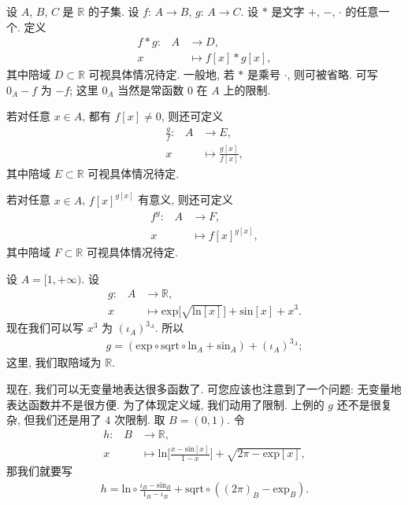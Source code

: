 \begin{definition}
    设 $A$, $B$, $C$ 是 $\mathbb{R}$ 的子集. 设 $f$: $A \to B$, $g$: $A \to C$. 设 $\ast$ 是文字 $+$, $-$, $\cdot$ 的任意一个. 定义
    \begin{align*}
        \text{$f \ast g$:} \quad
        A & \to D,                  \\
        x & \mapsto f[x] \ast g[x],
    \end{align*}
    其中陪域 $D \subset \mathbb{R}$ 可视具体情况待定. 一般地, 若 $\ast$ 是乘号 $\cdot$, 则可被省略. 可写 $0_A - f$ 为 $-f$; 这里 $0_A$ 当然是常函数 $0$ 在 $A$ 上的限制.

    若对任意 $x \in A$, 都有 $f[x] \neq 0$, 则还可定义
    \begin{align*}
        \text{$\frac{g}{f}$:} \quad
        A & \to E,                     \\
        x & \mapsto \frac{g[x]}{f[x]},
    \end{align*}
    其中陪域 $E \subset \mathbb{R}$ 可视具体情况待定.

    若对任意 $x \in A$, ${f[x]}^{g[x]}$ 有意义, 则还可定义
    \begin{align*}
        \text{${f}^{g}$:} \quad
        A & \to F,                 \\
        x & \mapsto {f[x]}^{g[x]},
    \end{align*}
    其中陪域 $F \subset \mathbb{R}$ 可视具体情况待定.
\end{definition}

\begin{example}
    设 $A = [1, +\infty)$. 设
    \begin{align*}
        \text{$g$:} \quad
        A & \to \mathbb{R},                                                                           \\
        x & \mapsto \mathrm{exp} {\bigg[ \sqrt{\mathrm{ln} {[x]}} \bigg]} + \mathrm{sin} {[x]} + x^3.
    \end{align*}
    现在我们可以写 $x^3$ 为 ${(\iota_A)}^{3_A}$. 所以
    \begin{align*}
        g = (\mathrm{exp} \circ \mathrm{sqrt} \circ \mathrm{ln}_{A} + \mathrm{sin}_{A}) + {(\iota_A)}^{3_A};
    \end{align*}
    这里, 我们取陪域为 $\mathbb{R}$.
\end{example}

现在, 我们可以无变量地表达很多函数了. 可您应该也注意到了一个问题: 无变量地表达函数并不是很方便. 为了体现定义域, 我们动用了限制. 上例的 $g$ 还不是很复杂, 但我们还是用了 $4$ 次限制. 取 $B = (0, 1)$. 令
\begin{align*}
    \text{$h$:} \quad
    B & \to \mathbb{R},                                                                                              \\
    x & \mapsto \mathrm{ln} {\bigg[ \frac{x - \mathrm{sin} {[x]}}{1 - x} \bigg]} + \sqrt{2\pi - \mathrm{exp} {[x]}},
\end{align*}
那我们就要写
\begin{align*}
    h = \mathrm{ln} \circ \frac{\iota_B - \mathrm{sin}_B}{1_B - \iota_B} + \mathrm{sqrt} \circ ((2\pi)_B - \mathrm{exp}_B).
\end{align*}

